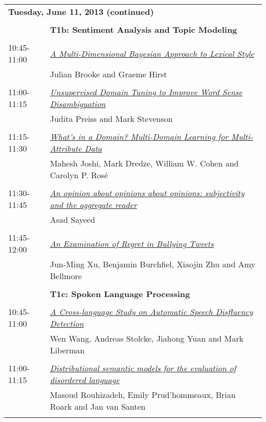 \begin{tabular}{p{20mm}p{138mm}}
\\
\multicolumn{2}{l}{\bf Tuesday, June 11, 2013
 (continued)} \\\\
 & {\bf T1b: Sentiment Analysis and Topic Modeling
} \\
\\
10:45-11:00 & \hyperlink{page.673}{\em A Multi-Dimensional Bayesian Approach to Lexical Style}\\
         & Julian Brooke and Graeme Hirst \\
\\

11:00-11:15 & \hyperlink{page.680}{\em Unsupervised Domain Tuning to Improve Word Sense Disambiguation}\\
         & Judita Preiss and Mark Stevenson \\
\\

11:15-11:30 & \hyperlink{page.685}{\em What’s in a Domain? Multi-Domain Learning for Multi-Attribute Data}\\
         & Mahesh Joshi, Mark Dredze, William W. Cohen and Carolyn P. Ros\'{e} \\
\\

11:30-11:45 & \hyperlink{page.691}{\em An opinion about opinions about opinions: subjectivity and the aggregate reader}\\
         & Asad Sayeed \\
\\

11:45-12:00 & \hyperlink{page.697}{\em An Examination of Regret in Bullying Tweets}\\
         & Jun-Ming Xu, Benjamin Burchfiel, Xiaojin Zhu and Amy Bellmore \\
\\

 & {\bf T1c: Spoken Language Processing
} \\
\\
10:45-11:00 & \hyperlink{page.703}{\em A Cross-language Study on Automatic Speech Disfluency Detection}\\
         & Wen Wang, Andreas Stolcke, Jiahong Yuan and Mark Liberman \\
\\

11:00-11:15 & \hyperlink{page.709}{\em Distributional semantic models for the evaluation of disordered language}\\
         & Masoud Rouhizadeh, Emily Prud'hommeaux, Brian Roark and Jan van Santen \\
\\


\end{tabular}

